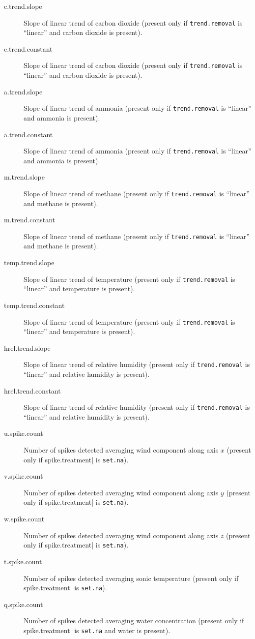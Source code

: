 \documentclass[a4paper,10pt]{book}
\begin{document}
\begin{description}
 \item[c.trend.slope] Slope of linear trend of carbon dioxide (present only if \verb|trend.removal| is ``linear'' and carbon dioxide is present).
 \item[c.trend.constant] Slope of linear trend of carbon dioxide (present only if \verb|trend.removal| is ``linear'' and carbon dioxide is present).
 \item[a.trend.slope] Slope of linear trend of ammonia (present only if \verb|trend.removal| is ``linear'' and ammonia is present).
 \item[a.trend.constant] Slope of linear trend of ammonia (present only if \verb|trend.removal| is ``linear'' and ammonia is present).
 \item[m.trend.slope] Slope of linear trend of methane (present only if \verb|trend.removal| is ``linear'' and methane is present).
 \item[m.trend.constant] Slope of linear trend of methane (present only if \verb|trend.removal| is ``linear'' and methane is present).
 \item[temp.trend.slope] Slope of linear trend of temperature (present only if \verb|trend.removal| is ``linear'' and temperature is present).
 \item[temp.trend.constant] Slope of linear trend of temperature (present only if \verb|trend.removal| is ``linear'' and temperature is present).
 \item[hrel.trend.slope] Slope of linear trend of relative humidity (present only if \verb|trend.removal| is ``linear'' and relative humidity is present).
 \item[hrel.trend.constant] Slope of linear trend of relative humidity (present only if \verb|trend.removal| is ``linear'' and relative humidity is present).
\item[u.spike.count] Number of spikes detected averaging wind component along axis $x$ (present only if \verb||spike.treatment| is \verb|set.na|).
 \item[v.spike.count] Number of spikes detected averaging wind component along axis $y$ (present only if \verb||spike.treatment| is \verb|set.na|).
 \item[w.spike.count] Number of spikes detected averaging wind component along axis $z$ (present only if \verb||spike.treatment| is \verb|set.na|).
 \item[t.spike.count] Number of spikes detected averaging sonic temperature (present only if \verb||spike.treatment| is \verb|set.na|).
 \item[q.spike.count] Number of spikes detected averaging water concentration (present only if \verb||spike.treatment| is \verb|set.na| and water is present).

\end{description}
\end{document}
